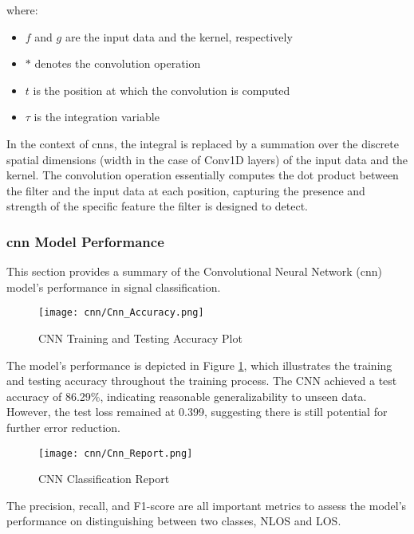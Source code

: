 where:

\begin{itemize}
  \item $f$ and $g$ are the input data and the kernel, respectively
  \item $*$ denotes the convolution operation
  \item $t$ is the position at which the convolution is computed
  \item $\tau$ is the integration variable
\end{itemize}

In the context of \acrshort{cnn}s, the integral is replaced by a summation over the discrete spatial dimensions (width in the case of Conv1D layers) of the input data and the kernel. The convolution operation essentially computes the dot product between the filter and the input data at each position, capturing the presence and strength of the specific feature the filter is designed to detect.


\subsubsection{\acrshort{cnn} Model Performance}

This section provides a summary of the Convolutional Neural Network (\acrshort{cnn}) model's performance in signal classification.

\begin{figure}[H] 
	\centering
	\texttt{[image: cnn/Cnn\_Accuracy.png]}
	\caption{CNN Training and Testing Accuracy Plot}\label{fig:cnn_accuracy}
\end{figure}

The model's performance is depicted in Figure \ref{fig:cnn_accuracy}, which illustrates the training and testing accuracy throughout the training process. The CNN achieved a test accuracy of 86.29\%, indicating reasonable generalizability to unseen data. However, the test loss remained at 0.399, suggesting there is still potential for further error reduction. 

\begin{figure}[H] 
	\centering
	\texttt{[image: cnn/Cnn\_Report.png]}
	\caption{CNN Classification Report}\label{cnn_report}
\end{figure}

The precision, recall, and F1-score are all important metrics to assess the model's performance on distinguishing between two classes, NLOS and LOS.

